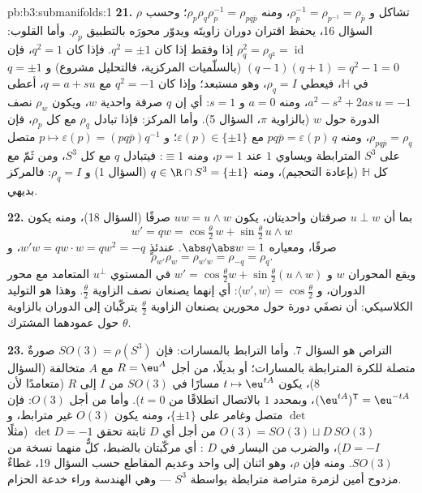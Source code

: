 \begin{solution}{pb:b3:submanifolds:1}
\textbf{21.} $\rho$ تشاكل و $\rho_p^{-1} =
\rho_{p^{-1}} = \rho_{\bar p}$، ومنه $\rho_p\rho_q\rho_p^{-1}
= \rho_{pq\bar p}$؛ وحسب السؤال
16، يحفظ اقتران دوران زاويتَه ويدوّر محورَه بالتطبيق $\rho_p$.
وأما القلوب: $\rho_q^2 = \rho_{q^2} = \operatorname{id}$ إذا وفقط إذا كان $q^2 = \pm1$. فإذا كان
$q^2 = 1$، فإن $(q - 1)(q + 1) = q^2 -
1 = 0$ (بالسلّميات المركزية، فالتحليل مشروع)
و $q = \pm1$ في  $\mathbb H$، فيعطي $\rho_q
= I$، وهو
مستبعد؛ وإذا كان $q^2 = -1$ مع $q = a +
su$، أعطى $a^2 - s^2 + 2as\,u = -1$، ومنه
$a = 0$ و $s = 1$: أي إن $q$ صرفة واحدية $w$، ويكون $\rho_w$
نصف الدورة حول $w$ (بالزاوية $\pi$، السؤال 5). وأما المركز:
فإذا تبادل $\rho_q$ مع كل $\rho_p$، فإن $\rho_{pq\bar p} = \rho_q$، ومنه $pq\bar p = \varepsilon(p)\,q$
مع $\varepsilon(p) \in
\{\pm1\}$؛ و $p \mapsto \varepsilon(p) = (pq\bar p)q^{-1}$ متصل على $S^3$ المترابطة ويساوي $1$ عند
$p =
1$، ومنه $\equiv 1$: فيتبادل $q$ مع كل $S^3$، ومن ثَمّ مع
كل $\mathbb H$ (بإعادة التحجيم)، ومنه $q \in \R \cap S^3 =
\{\pm1\}$ (السؤال 1)
و $\rho_q = I$: فالمركز بديهي.

\textbf{22.} بما أن $u \perp w$ صرفتان واحديتان، يكون $uw =
u\wedge w$
صرفًا (السؤال 18)، ومنه يكون
\[
w' = qw = \cos\tfrac\theta2\,w + \sin\tfrac\theta2\,u\wedge
w
\]
صرفًا، ومعياره $\abs q\abs w = 1$. عندئذٍ $w'w = qw\cdot w
= qw^2 = -q$، و
\[
\rho_{w'}\rho_w = \rho_{w'w} = \rho_{-q} = \rho_q .
\]
ويقع المحوران $w$ و $w' = \cos\frac\theta2 w +
\sin\frac\theta2(u\wedge w)$ في المستوي $u^\perp$ المتعامد مع
محور الدوران، و $\langle w', w\rangle
= \cos\frac\theta2$: أي إنهما يصنعان نصف الزاوية
$\frac\theta2$. وهذا هو التوليد الكلاسيكي: أن نصفَي دورة حول
محورين يصنعان الزاوية $\frac\theta2$ يتركّبان إلى الدوران
بالزاوية $\theta$ حول عمودهما المشترك.

\textbf{23.} التراص هو السؤال 7. وأما الترابط بالمسارات:
فإن $SO(3) = \rho(S^3)$ صورةٌ متصلة للكرة المترابطة بالمسارات؛ أو بديلًا،
من أجل $R = \eu^{A}$ مع $A$ متخالفة (السؤال 8)، يكون $t \mapsto \eu^{tA}$
مسارًا في $SO(3)$ من $I$ إلى $R$ (متعامدًا لأن $(\eu^{tA})^{\mathsf T} = \eu^{-tA}$، وبمحدد
$1$ بالاتصال انطلاقًا من $t = 0$). وأما من أجل $O(3)$: فإن
$\det$ متصل وغامر على $\{\pm1\}$، ومنه يكون $O(3)$ غير مترابط،
و $O(3) = SO(3)
\sqcup D\,SO(3)$ من أجل أي $D$ ثابتة تحقق $\det D = -1$ (مثلًا
$D = -I$)، والضرب من اليسار في $D$ : أي مركّبتان
بالضبط، كلٌّ منهما نسخة من $SO(3)$. ومنه فإن $\rho$، وهو اثنان
إلى واحد وعديم المقاطع حسب السؤال 19، غطاءٌ مزدوج أمين لزمرة
متراصة مترابطة بواسطة $S^3$  --- وهي الهندسة
وراء خدعة الحزام.


\end{solution}
